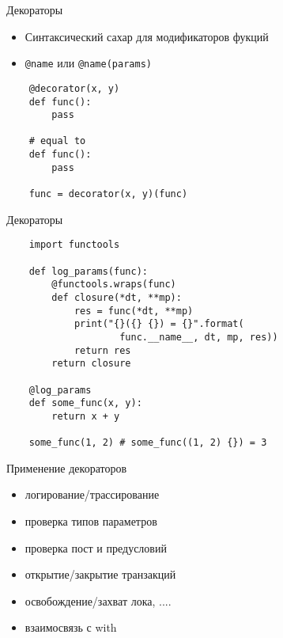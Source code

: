 \documentclass{article}
\begin{document}
\begin{center} Декораторы \end{center}
\begin{itemize}
    \item Синтаксический сахар для модификаторов фукций
    \item \lstinline!@name! или \lstinline!@name(params)!
\end{itemize}
\vspace{15pt}
\begin{lstlisting}
    @decorator(x, y)
    def func():
        pass

    # equal to
    def func():
        pass

    func = decorator(x, y)(func)
\end{lstlisting}
\newpage

\begin{center} Декораторы \end{center}
\vspace{15pt}
\begin{lstlisting}
    import functools

    def log_params(func):
        @functools.wraps(func)
        def closure(*dt, **mp):
            res = func(*dt, **mp)
            print("{}({} {}) = {}".format(
                    func.__name__, dt, mp, res))
            return res
        return closure

    @log_params
    def some_func(x, y):
        return x + y

    some_func(1, 2) # some_func((1, 2) {}) = 3
\end{lstlisting}
\newpage
\begin{center} Применение декораторов \end{center}
\begin{itemize}
    \item логирование/трассирование
    \item проверка типов параметров
    \item проверка пост и предусловий
    \item открытие/закрытие транзакций
    \item освобождение/захват лока, ....
    \item взаимосвязь с with
\end{itemize}
\newpage
\end{document}
